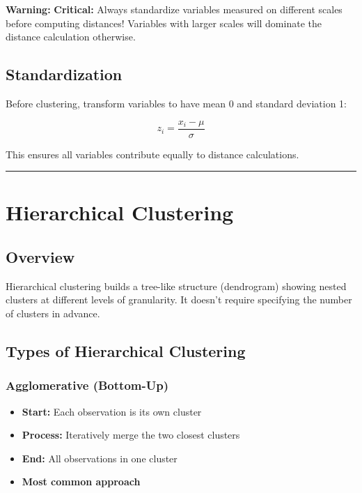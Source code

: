 \documentclass[
]{article}
\begin{document}
\textbf{Warning: } \textbf{Critical:} Always standardize variables
measured on different scales before computing distances! Variables with
larger scales will dominate the distance calculation otherwise.

\textbf{ }

\subsection{Standardization}

Before clustering, transform variables to have mean 0 and standard
deviation 1:

\[z_{i} = \frac{x_{i} - \mu}{\sigma}\]

This ensures all variables contribute equally to distance calculations.

\begin{center}\rule{0.5\linewidth}{0.5pt}\end{center}

\textbf{ }

\section{Hierarchical Clustering}

\textbf{ }

\subsection{Overview}

Hierarchical clustering builds a tree-like structure (dendrogram)
showing nested clusters at different levels of granularity. It doesn't
require specifying the number of clusters in advance.

\textbf{ }

\subsection{Types of Hierarchical Clustering}

\subsubsection{Agglomerative (Bottom-Up)}

\begin{itemize}
\item
  \textbf{Start:} Each observation is its own cluster
\item
  \textbf{Process:} Iteratively merge the two closest clusters
\item
  \textbf{End:} All observations in one cluster
\item
  \textbf{Most common approach}
\end{itemize}
\end{document}
